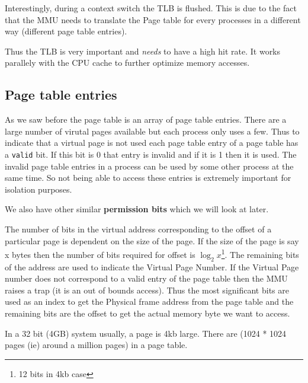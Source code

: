 \documentclass[12pt]{article}
\newcommand{\tbox}[1]{\noindent\fbox{\parbox{\textwidth}{#1}}}
\begin{document}
Interestingly, during a context switch the TLB is flushed. This is due to the fact that the MMU needs to translate the Page table for every processes in a different
way (different page table entries).


Thus the TLB is very important and \textit{needs} to have a high hit rate. It works 
parallely with the CPU cache to further optimize memory accesses.  
\\


\noindent\tbox{
    \begin{center}
    \textbf{\Huge Lecture 14}\\
    \end{center}
}

\subsection*{Page table entries}
As we saw before the page table is an array of page table entries. 
There are a large number of virutal pages available but each process only uses a few. Thus to indicate that
a virtual page is not used each page table entry of a page table has a \texttt{valid} bit. If this bit is 0 that entry is invalid and if it is 1 then it is used. 
The invalid page table entries in a process can be used by some other process at the same time. So not being able to access these entries is extremely important for isolation purposes.

We also have other similar \textbf{permission bits} which we will look at later.

The number of bits in the virtual address corresponding to the offset of a particular page is dependent on the size of the page. 
If the size of the page is say x bytes then the number of bits required for offset is \(\log_{2} x\)\footnote{12 bits in 4kb case}. The remaining bits of the address are used to indicate the 
Virtual Page Number. If the Virtual Page number does not correspond to a valid entry of the page table then the MMU raises a trap (it is an out of bounds access). Thus the most significant bits are used as an index to get the Physical frame address from the 
page table and the remaining bits are the offset to get the actual memory byte we want to access. 

In a 32 bit (4GB) system usually, a page is 4kb large. There are (1024 * 1024 pages (ie) around a million pages) in a page table.
\end{document}
